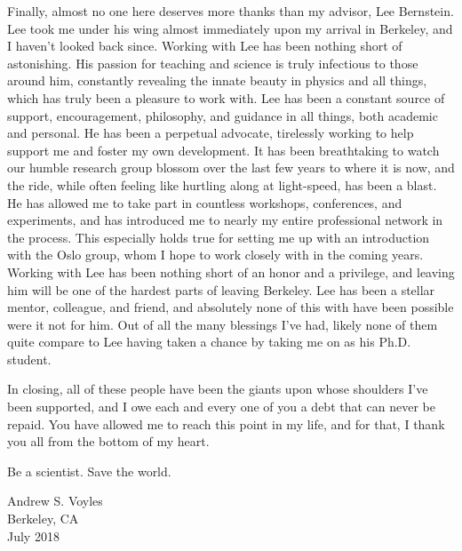 \documentclass[
]{ucbthesis}
\begin{document}
\begin{frontmatter}
\begin{acknowledgements}
Finally, almost no one here deserves more thanks than my advisor, Lee Bernstein.
Lee took me under his wing almost immediately upon my arrival in Berkeley, and I haven't looked back since.
Working with Lee has been nothing short of astonishing. 
His passion for teaching and science is truly infectious to those around him, constantly revealing the innate beauty in physics and all things,  which has truly been a pleasure to work with.
Lee has been  a constant source of support, encouragement, philosophy, and guidance in all things, both academic and personal.
He has been a perpetual advocate, tirelessly working to help support me and foster my own development.
It has been breathtaking to watch our humble research group blossom over the last few years to where it is now, and the ride, while often feeling  like hurtling along at light-speed, has been a blast.
He has allowed me to take part in countless workshops, conferences, and  experiments, and has introduced me to nearly my entire professional network in the process.
This especially holds true for setting me up with an introduction with the Oslo group, whom I hope to work closely with in the coming years. 
Working with Lee has been nothing short of an honor and a privilege, and leaving him will be one of the hardest parts of leaving Berkeley.
Lee has been a stellar mentor, colleague, and friend, and absolutely none of this with have been possible were it not for him.
Out of all the many blessings I've had, likely none of them  quite compare to Lee having  taken a chance by taking me on as his Ph.D. student.





In closing, all of these people have been the giants upon whose shoulders I've been supported, and I owe each and every one of you a debt that can never be repaid.
You have allowed me to reach this point in my life, and for that, I thank you all from the bottom of my heart.

\vspace{5cm}






Be a scientist. Save the world.

\hspace*{\fill} Andrew S. Voyles\\
\hspace*{\fill} Berkeley, CA\\
\hspace*{\fill} July 2018



\end{acknowledgements}

\end{frontmatter}
\end{document}

